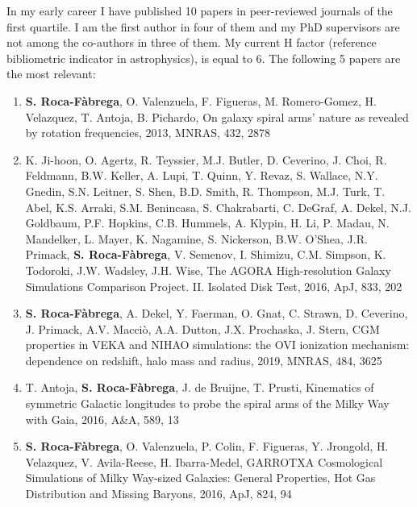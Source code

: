 \documentclass[oneside, a4paper, onecolumn, 11pt]{article}
\begin{document}
{In my early career I have published 10 papers in peer-reviewed journals of the first quartile. I am the first author in four of them and my PhD supervisors are not among the co-authors in three of them. My current H factor (reference bibliometric indicator in astrophysics), is equal to 6. The following 5 papers are the most relevant:

\begin{enumerate}
    \item {\bf S. Roca-F\`abrega}, O. Valenzuela, F. Figueras, M. Romero-G\´omez, H. Vel\´azquez, T. Antoja, B. Pichardo, On galaxy spiral arms' nature as revealed by rotation frequencies, 2013, MNRAS, 432, 2878
    \item K. Ji-hoon, O. Agertz, R. Teyssier, M.J. Butler, D. Ceverino, J. Choi, R. Feldmann, B.W. Keller, A. Lupi, T. Quinn, Y. Revaz, S. Wallace, N.Y. Gnedin, S.N. Leitner, S. Shen, B.D. Smith, R. Thompson, M.J. Turk, T. Abel, K.S. Arraki, S.M. Benincasa, S. Chakrabarti, C. DeGraf, A. Dekel, N.J. Goldbaum, P.F. Hopkins, C.B. Hummels, A. Klypin, H. Li, P. Madau, N. Mandelker, L. Mayer, K. Nagamine, S. Nickerson, B.W. O'Shea, J.R. Primack, {\bf S. Roca-Fàbrega}, V. Semenov, I. Shimizu, C.M. Simpson, K. Todoroki, J.W. Wadsley, J.H. Wise, The AGORA High-resolution Galaxy Simulations Comparison Project. II. Isolated Disk Test, 2016, ApJ, 833, 202
    \item {\bf S. Roca-F\`abrega}, A. Dekel, Y. Faerman, O. Gnat, C. Strawn, D. Ceverino, J. Primack, A.V. Macciò, A.A. Dutton, J.X. Prochaska, J. Stern, CGM properties in VEKA and NIHAO simulations: the OVI ionization mechanism: dependence on redshift, halo mass and radius, 2019, MNRAS, 484, 3625
    \item T. Antoja, {\bf S. Roca-F\`abrega}, J. de Bruijne, T. Prusti, Kinematics of symmetric Galactic longitudes to probe the spiral arms of the Milky Way with Gaia, 2016, A\&A, 589, 13
    \item {\bf S. Roca-F\`abrega}, O. Valenzuela, P. Col\´in, F. Figueras, Y. Jrongold, H. Vel\´azquez, V. \´Avila-Reese, H. Ibarra-Medel, GARROTXA Cosmological Simulations of Milky Way-sized Galaxies: General Properties, Hot Gas Distribution and Missing Baryons, 2016, ApJ, 824, 94
\end{enumerate}\\

}
\end{document}
